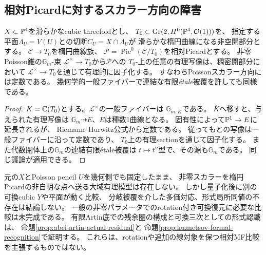 \subsection{相対Picardに対するスカラー方向の障害}
\begin{proposition}\label{prop:relative-scalar-picard}
$X\subset\mathbb P^4$を滑らかなcubic threefoldとし、
$T_0\subset\operatorname{Gr}(2,H^0(\mathbb P^4,\mathcal O(1)))$を、
指定する平面$\Lambda_U=V(U)$との切断$C_U=X\cap\Lambda_U$が
滑らかな楕円曲線になる非空開部分とする。
$\mathscr C\to T_0$を楕円曲線族、
$\mathscr P=\operatorname{Pic}^0(\mathscr C/T_0)$を相対Picardとする。
非零Poisson錐の$\mathbb G_m$-束
$\mathscr L^\times\to T_0$から$\mathscr P$への
$T_0$-上の任意の有理写像は、稠密開部分において
$\mathscr L^\times\to T_0$を通じて有理的に因子化する。
すなわちPoissonスカラー方向には定数である。
幾何学的一般ファイバーで連結な有限\emph{étale}被覆を許しても同様である。
\end{proposition}
\begin{proof}
$K=\mathbb C(T_0)$とする。$\mathscr L^\times$の一般ファイバーは
$\mathbb G_{m,K}$である。
$\overline K$へ移すと、与えられた有理写像は
$\mathbb G_m\dashrightarrow E$、$E$は種数1曲線となる。
固有性によって$\mathbb P^1\to E$に延長されるが、
Riemann--Hurwitz公式から定数である。
従ってもとの写像は一般ファイバーに沿って定数であり、
$T_0$上の有理sectionを通じて因子化する。
また代数閉体上の$\mathbb G_m$の連結有限étale被覆は
$t\mapsto t^n$型で、その源も$\mathbb G_m$である。
同じ議論が適用できる。
\end{proof}
\begin{remark}[復元への含意と限界]
元の$X$とPoisson pencil $U$を幾何側でも固定したまま、
非零スカラーを楕円Picardの非自明な点へ送る大域有理模型は存在しない。
しかし量子化後に別の可換cubic $Y$や平面が動く比較、
分岐被覆を介した多価対応、形式局所同値の不存在は結論しない。
一般の非零パラメータでのrotation付き可換復元に必要な比較は未完成である。
有限Artin底での残余圏の構成と可換三次としての形式認識は、
命題\ref{prop:abel-artin-actual-residual}と
命題\ref{prop:kuznetsov-formal-recognition}で証明する。
これらは、rotationや追加の線対象を保つ相対MF比較を主張するものではない。
\end{remark}
